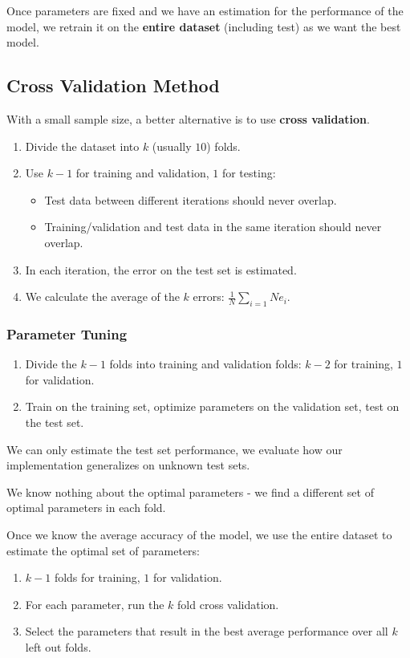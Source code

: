 \documentclass[11pt]{article}
\begin{document}
Once parameters are fixed and we have an estimation for the performance of the model, we retrain it on the \textbf{entire dataset} (including test) as we want the best model.

\subsection{Cross Validation Method}
With a small sample size, a better alternative is to use \textbf{cross validation}.

\begin{enumerate}
  \item Divide the dataset into $k$ (usually $10$) folds.
  \item Use $k - 1$ for training and validation, $1$ for testing:
    \begin{itemize}
      \item Test data between different iterations should never overlap.  
      \item Training/validation and test data in the same iteration should never overlap.
    \end{itemize}
  \item In each iteration, the error on the test set is estimated.
  \item We calculate the average of the $k$ errors: $\frac{1}{N}\sum_{i = 1}{N} e_i$.
\end{enumerate}

\subsubsection{Parameter Tuning}
\begin{enumerate}
  \item Divide the $k-1$ folds into training and validation folds: $k - 2$ for training, $1$ for validation.
  \item Train on the training set, optimize parameters on the validation set, test on the test set.
\end{enumerate}
We can only estimate the test set performance, we evaluate how our implementation generalizes on unknown test sets.

We know nothing about the optimal parameters - we find a different set of optimal parameters in each fold.

Once we know the average accuracy of the model, we use the entire dataset to estimate the optimal set of parameters:
\begin{enumerate}
  \item $k-1$ folds for training, $1$ for validation.
  \item For each parameter, run the $k$ fold cross validation.
  \item Select the parameters that result in the best average performance over all $k$ left out folds.
\end{enumerate}
\end{document}

